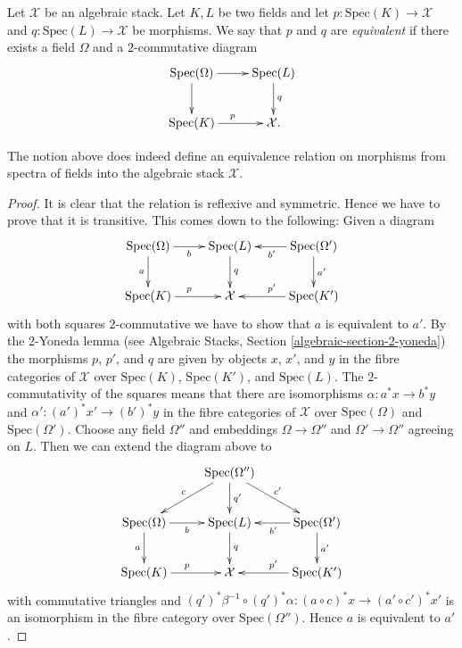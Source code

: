 \noindent
Let $\mathcal{X}$ be an algebraic stack. Let $K, L$ be two fields
and let $p : \text{Spec}(K) \to \mathcal{X}$ and
$q : \text{Spec}(L) \to \mathcal{X}$ be morphisms.
We say that $p$ and $q$ are {\it equivalent} if there exists a
field $\Omega$ and a $2$-commutative diagram
$$
\xymatrix{
\text{Spec}(\Omega) \ar[r] \ar[d] &
\text{Spec}(L) \ar[d]^q \\
\text{Spec}(K) \ar[r]^p &
\mathcal{X}.
}
$$

\begin{lemma}
\label{lemma-equivalence}
The notion above does indeed define an equivalence relation on
morphisms from spectra of fields into the algebraic stack $\mathcal{X}$.
\end{lemma}

\begin{proof}
It is clear that the relation is reflexive and symmetric.
Hence we have to prove that it is transitive. This comes down
to the following: Given a diagram
$$
\xymatrix{
\text{Spec}(\Omega) \ar[r]_b \ar[d]_a &
\text{Spec}(L) \ar[d]^q & \text{Spec}(\Omega') \ar[l]^{b'} \ar[d]^{a'} \\
\text{Spec}(K) \ar[r]^p &
\mathcal{X} &
\text{Spec}(K') \ar[l]_{p'}
}
$$
with both squares $2$-commutative we have to show that $a$ is equivalent to
$a'$. By the $2$-Yoneda lemma (see
Algebraic Stacks, Section \ref{algebraic-section-2-yoneda})
the morphisms $p$, $p'$, and $q$ are given by objects
$x$, $x'$, and $y$ in the fibre categories of $\mathcal{X}$ over
$\text{Spec}(K)$, $\text{Spec}(K')$, and $\text{Spec}(L)$. The
$2$-commutativity of the squares means that there are isomorphisms
$\alpha : a^*x \to b^*y$ and $\alpha' : (a')^*x' \to (b')^*y$
in the fibre categories
of $\mathcal{X}$ over $\text{Spec}(\Omega)$ and $\text{Spec}(\Omega')$.
Choose any field $\Omega''$ and embeddings
$\Omega \to \Omega''$ and $\Omega' \to \Omega''$ agreeing on $L$.
Then we can extend the diagram above to
$$
\xymatrix{
& \text{Spec}(\Omega'') \ar[ld]_c \ar[d]^{q'} \ar[rd]^{c'} \\
\text{Spec}(\Omega) \ar[r]_b \ar[d]_a &
\text{Spec}(L) \ar[d]^q & \text{Spec}(\Omega') \ar[l]^{b'} \ar[d]^{a'} \\
\text{Spec}(K) \ar[r]^p &
\mathcal{X} &
\text{Spec}(K') \ar[l]_{p'}
}
$$
with commutative triangles and
$(q')^*\beta^{-1} \circ (q')^*\alpha : (a \circ c)^*x \to (a' \circ c')^*x'$
is an isomorphism in the fibre category over $\text{Spec}(\Omega'')$.
Hence $a$ is equivalent to $a'$.
\end{proof}

